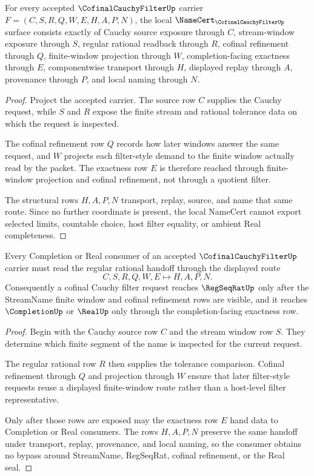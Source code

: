 \begin{theorem}
\label{thm:cofinal-cauchy-filter-namecert-obligations}
For every accepted $\CofinalCauchyFilterUp$ carrier $F=(C,S,R,Q,W,E,H,A,P,N)$, the local $\NameCert_{\CofinalCauchyFilterUp}$ surface consists exactly of Cauchy source exposure through $C$, stream-window exposure through $S$, regular rational readback through $R$, cofinal refinement through $Q$, finite-window projection through $W$, completion-facing exactness through $E$, componentwise transport through $H$, displayed replay through $A$, provenance through $P$, and local naming through $N$.
\end{theorem}
\begin{proof}
Project the accepted carrier. The source row $C$ supplies the Cauchy request, while $S$ and $R$ expose the finite stream and rational tolerance data on which the request is inspected.

The cofinal refinement row $Q$ records how later windows answer the same request, and $W$ projects each filter-style demand to the finite window actually read by the packet. The exactness row $E$ is therefore reached through finite-window projection and cofinal refinement, not through a quotient filter.

The structural rows $H,A,P,N$ transport, replay, source, and name that same route. Since no further coordinate is present, the local NameCert cannot export selected limits, countable choice, host filter equality, or ambient Real completeness.
\end{proof}

\begin{theorem}
\label{thm:cofinal-cauchy-filter-regseqrat-handoff}
Every Completion or Real consumer of an accepted $\CofinalCauchyFilterUp$ carrier must read the regular rational handoff through the displayed route
$$
C,S,R,Q,W,E \longmapsto H,A,P,N .
$$
Consequently a cofinal Cauchy filter request reaches $\RegSeqRatUp$ only after the StreamName finite window and cofinal refinement rows are visible, and it reaches $\CompletionUp$ or $\RealUp$ only through the completion-facing exactness row.
\end{theorem}
\begin{proof}
Begin with the Cauchy source row $C$ and the stream window row $S$. They determine which finite segment of the name is inspected for the current request.

The regular rational row $R$ then supplies the tolerance comparison. Cofinal refinement through $Q$ and projection through $W$ ensure that later filter-style requests reuse a displayed finite-window route rather than a host-level filter representative.

Only after those rows are exposed may the exactness row $E$ hand data to Completion or Real consumers. The rows $H,A,P,N$ preserve the same handoff under transport, replay, provenance, and local naming, so the consumer obtains no bypass around StreamName, RegSeqRat, cofinal refinement, or the Real seal.
\end{proof}

